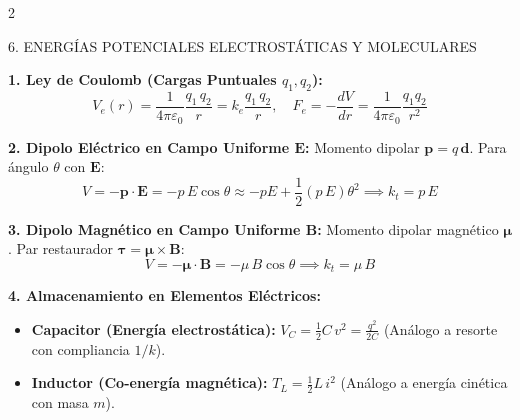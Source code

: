 \documentclass[10pt,a4paper]{article}
\newcommand{\seccion}[1]{%
  \vspace{2mm}%
  \noindent\colorbox{urlblue}{\parbox{\dimexpr\linewidth-2\fboxsep\relax}{%
    \color{white}\footnotesize\bfseries\strut\MakeUppercase{#1}}}%
  \vspace{1.5mm}%
}
\begin{document}
\begin{multicols}{2}

\seccion{6. Energías Potenciales Electrostáticas y Moleculares}

\textbf{1. Ley de Coulomb (Cargas Puntuales $q_1, q_2$):}
\begin{equation*}
  V_e(r) = \frac{1}{4\pi\varepsilon_0} \frac{q_1\,q_2}{r} = k_e \frac{q_1\,q_2}{r}, \quad F_e = -\frac{dV}{dr} = \frac{1}{4\pi\varepsilon_0}\frac{q_1 q_2}{r^2}
\end{equation*}

\textbf{2. Dipolo Eléctrico en Campo Uniforme $\mathbf{E}$:}
Momento dipolar $\mathbf{p} = q\,\mathbf{d}$. Para ángulo $\theta$ con $\mathbf{E}$:
\begin{equation*}
  V = -\mathbf{p}\cdot\mathbf{E} = -p\,E\cos\theta \approx -pE + \frac{1}{2}(p\,E)\theta^2 \implies k_{t} = p\,E
\end{equation*}

\textbf{3. Dipolo Magnético en Campo Uniforme $\mathbf{B}$:}
Momento dipolar magnético $\boldsymbol{\mu}$. Par restaurador $\boldsymbol{\tau} = \boldsymbol{\mu} \times \mathbf{B}$:
\begin{equation*}
  V = -\boldsymbol{\mu}\cdot\mathbf{B} = -\mu\,B\cos\theta \implies k_t = \mu\,B
\end{equation*}

\textbf{4. Almacenamiento en Elementos Eléctricos:}
\begin{itemize}\setlength{\itemsep}{0pt}\setlength{\parskip}{0pt}
  \item \textbf{Capacitor (Energía electrostática):}
    $V_C = \frac{1}{2} C\,v^2 = \frac{q^2}{2C}$ (Análogo a resorte con compliancia $1/k$).
  \item \textbf{Inductor (Co-energía magnética):}
    $T_L = \frac{1}{2} L\,i^2$ (Análogo a energía cinética con masa $m$).
\end{itemize}


\end{multicols}
\end{document}
